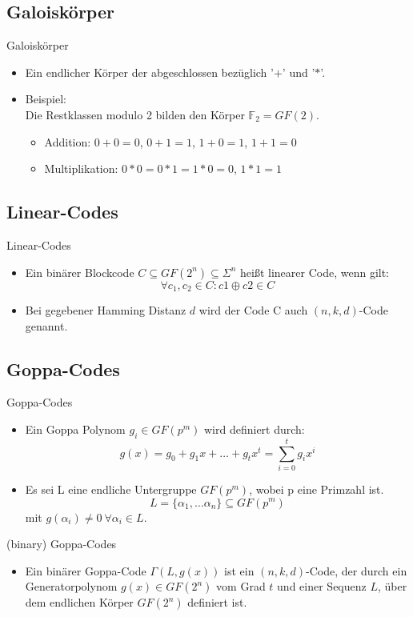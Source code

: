 \documentclass[11pt%
,aspectratio=169%
]{beamer}
\begin{document}
\subsection{Galoiskörper}
\begin{frame}{Galoiskörper}
	\begin{itemize}
		\item Ein endlicher Körper der abgeschlossen bezüglich '$+$' und '$*$'.\\
		\item Beispiel:\\
		   Die Restklassen modulo 2 bilden den Körper $\mathbb{F}_{2} = GF(2)$. \cite{Kunz1991}\\
		   \begin{itemize}		  
		   	\item Addition: $0+0=0$, $0+1=1$, $1+0=1$, $1+1=0$ \\
		    \item Multiplikation: $0*0 = 0*1 = 1*0 = 0$, $1*1=1$ 	
		   	\end{itemize}
	\end{itemize}
\end{frame}

\subsection{Linear-Codes}
\begin{frame}{Linear-Codes}
	\begin{itemize}
		\item Ein binärer Blockcode $C\subseteq GF(2^n) \subseteq \Sigma^n$ heißt linearer Code, wenn gilt:
			\[\forall c_1,c_2 \in C \colon c1\oplus c2 \in C \]
		\item Bei gegebener Hamming Distanz $d$ wird der Code C auch $(n,k,d)$-Code genannt. 
	\end{itemize}
\end{frame}


\subsection{Goppa-Codes}

\begin{frame}{Goppa-Codes}
	\begin{itemize}
		\item Ein Goppa Polynom $g_i \in GF(p^m)$ wird definiert durch:
			\[ g(x) = g_0+g_1x +\ldots+ g_tx^t = \sum_{i=0}^t g_ix^i \]
		\item Es sei L eine endliche Untergruppe $GF(p^m)$, wobei p eine Primzahl ist.
			\[L =\{\alpha_1,\ldots\alpha_n\}\subseteq GF(p^m) \] mit $g(\alpha_i)\neq 0~ \forall \alpha_i \in L$. 
	\end{itemize}
\end{frame}
\begin{frame}{(binary) Goppa-Codes}
	\begin{itemize}
		\item Ein binärer Goppa-Code $\Gamma(L,g(x))$ ist ein $(n,k,d)$-Code, der durch ein Generatorpolynom $g(x) \in GF(2^n)$ vom Grad $t$ und einer Sequenz $L$, über dem endlichen Körper $GF(2^n)$ definiert ist. 
	\end{itemize}
\end{frame}
\end{document}
